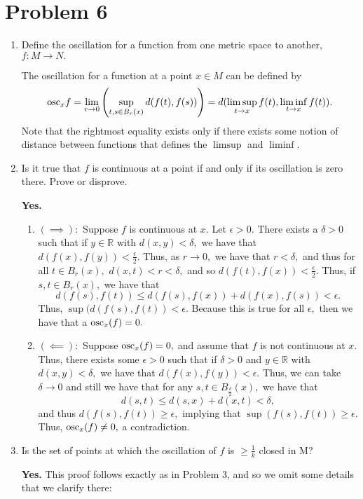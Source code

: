 \documentclass[11pt]{article}
\newcommand{\bbR}{\mathbb{R}}
\begin{document}
\newcommand{\id}{\text{id}}
\newpage
\section*{Problem 6}
\begin{enumerate}
    \item 
    \begin{problem}
    Define the oscillation for a function from one metric space to another, $f : M \to N.$
    \end{problem}
    \begin{solution}
        The oscillation for a function at a point $x\in M$ can be defined by 
        \[\text{osc}_xf = \lim_{r \to 0}\left(\sup_{t,s \in B_r(x)}d(f(t), f(s))\right) = d(\limsup_{t\to x}f(t), \liminf_{t\to x}f(t)).\] Note that the rightmost equality exists only if there exists some notion of distance between functions that defines the $\limsup$ and $\liminf.$
    \end{solution}
    \item 
    \begin{problem}
         Is it true that $f$ is continuous at a point if and only if its oscillation is zero there. Prove or disprove.
    \end{problem}
    \begin{solution}
        \textbf{Yes.}
        \begin{enumerate}
            \item $(\implies):$ Suppose $f$ is continuous at $x$. Let $\epsilon>0.$ There exists a $\delta>0$ such that if $y\in \bbR$ with $d(x,y)<\delta,$ we have that $d(f(x), f(y))<\frac{\epsilon}{2}.$ Thus, as $r\to 0,$ we have that $r<\delta,$ and thus for all $t\in B_r(x),$ $d(x,t)<r<\delta,$ and so $d(f(t), f(x))<\frac{\epsilon}{2}.$ Thus, if $s,t \in B_r(x),$ we have that
            \[d(f(s), f(t))\leq d(f(s), f(x)) + d(f(x), f(s))< \epsilon.\] Thus, $\sup(d(f(s), f(t)) <\epsilon.$ Because this is true for all $\epsilon,$ then we have that a $\text{osc}_x(f) = 0.$
            \item $(\impliedby):$ Suppose $\text{osc}_x(f) = 0,$ and assume that $f$ is not continuous at $x.$ Thus, there exists some $\epsilon>0$ such that if $\delta>0$ and $y\in \bbR$ with $d(x,y)<\delta,$ we have that $d(f(x), f(y))< \epsilon.$ Thus, we can take $\delta \to 0$ and still we have that for any $s,t\in B_{\frac\delta 2}(x),$ we have that 
            \[d(s,t)\leq d(s,x) + d(x,t)< \delta,\] and thus $d(f(s), f(t))\geq\epsilon,$ implying that $\sup(f(s), f(t))\geq \epsilon.$ Thus, $\text{osc}_x(f)\neq 0,$ a contradiction.
        \end{enumerate}
    \end{solution}
    \item 
    \begin{problem}
         Is the set of points at which the oscillation of $f$ is $\geq \frac{1}{k}$ closed in M?
    \end{problem}
    \begin{solution}
        \textbf{Yes.} This proof follows exactly as in Problem 3, and so we omit some details that we clarify there:\\


\end{solution}
\end{enumerate}
\end{document}
